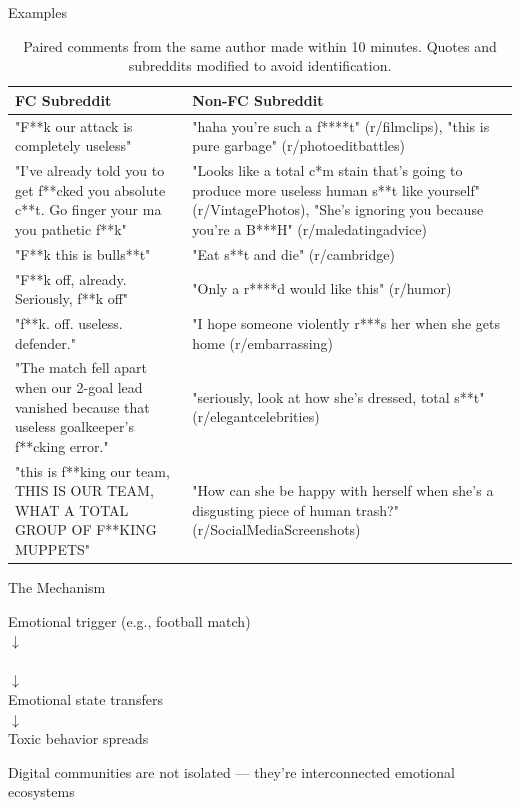 \documentclass[10pt]{beamer}
\begin{document}
\begin{frame}{Examples}

{\footnotesize
\begin{table}[htbp] %
  \centering
  \begin{tabular}{p{.45\linewidth} p{.5\linewidth}}
    \hline
    \textbf{FC Subreddit} & \textbf{Non-FC Subreddit} \\
    \hline
    "F**k our attack is completely useless" & 
    "haha you're such a f****t" (r/filmclips), "this is pure garbage" (r/photoeditbattles) \\
    "I've already told you to get f**cked you absolute c**t. Go finger your ma you pathetic f**k" & 
    "Looks like a total c*m stain that's going to produce more useless human s**t like yourself" (r/VintagePhotos), "She's ignoring you because you're a B***H" (r/maledatingadvice) \\
    "F**k this is bulls**t" & "Eat s**t and die" (r/cambridge) \\
    "F**k off, already. Seriously, f**k off" & "Only a r****d would like this" (r/humor) \\
    "f**k. off. useless. defender." & "I hope someone violently r***s her when she gets home (r/embarrassing) \\
    "The match fell apart when our 2-goal lead vanished because that useless goalkeeper's f**cking error." & "seriously, look at how she's dressed, total s**t" (r/elegantcelebrities) \\
    "this is f**king our team, THIS IS OUR TEAM, WHAT A TOTAL GROUP OF F**KING MUPPETS" & "How can she be happy with herself when she's a disgusting piece of human trash?" (r/SocialMediaScreenshots) \\
    \hline
  \end{tabular}
  \caption{Paired comments from the same author made within 10 minutes. Quotes and subreddits modified to avoid identification.}
  \label{tab:bad_pairs}
\end{table} %
}
\end{frame}

\begin{frame}{The Mechanism}
\begin{center}
\large
Emotional trigger (e.g., football match)
\\ $\downarrow$ \\
\\ $\downarrow$ \\
Emotional state transfers 
\\ $\downarrow$ \\
Toxic behavior spreads
\end{center}

Digital communities are not isolated --- they're interconnected emotional ecosystems
\end{frame}
\end{document}
